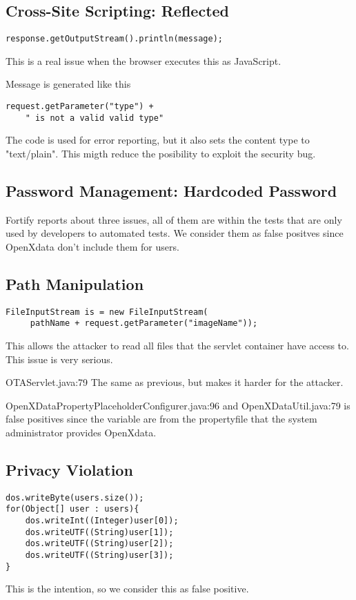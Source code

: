 \documentclass[11pt,a4paper]{article}
\theoremstyle{definition}
\begin{document}
\subsection{Cross-Site Scripting: Reflected}
\begin{lstlisting}[caption=StudyExportServlet.java:106]
response.getOutputStream().println(message);
\end{lstlisting}
This is a real issue when the browser executes this as JavaScript.

Message is generated like this
\begin{lstlisting}
request.getParameter("type") + 
    " is not a valid valid type"
\end{lstlisting}
The code is used for error reporting, but it also sets the content type to "text/plain".
This migth reduce the posibility to exploit the security bug.

\subsection{Password Management: Hardcoded Password}
Fortify reports about three issues, all of them are within the tests that are only used
by developers to automated tests. We consider them as false positves since OpenXdata don't
include them for users.

\subsection{Path Manipulation}
\begin{lstlisting}[caption=BirtImagesServlet.java:61]
FileInputStream is = new FileInputStream(
     pathName + request.getParameter("imageName"));
\end{lstlisting}
This allows the attacker to read all files that the servlet container have access to. This issue is very serious.

OTAServlet.java:79
The same as previous, but makes it harder for the attacker.

OpenXDataPropertyPlaceholderConfigurer.java:96 and OpenXDataUtil.java:79 
is false positives since the variable are from the propertyfile that the system administrator provides OpenXdata.

\subsection{Privacy Violation}
\begin{lstlisting}[caption=DefaultXformSerializer.java:99-102]
dos.writeByte(users.size());
for(Object[] user : users){
    dos.writeInt((Integer)user[0]);
    dos.writeUTF((String)user[1]);
    dos.writeUTF((String)user[2]);
    dos.writeUTF((String)user[3]);
}
\end{lstlisting}
This is the intention, so we consider this as false positive.
\end{document}

